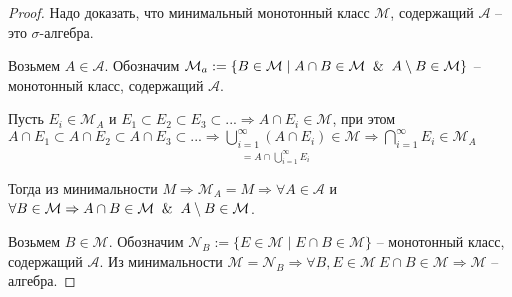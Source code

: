 \begin{proof}
    Надо доказать, что минимальный монотонный класс $\mathcal{M}$, содержащий $\mathcal{A}$ – это $\sigma$-алгебра.

    Возьмем $A\in \mathcal{A}$. Обозначим $\mathcal{M}_a :=\{B\in \mathcal{M} \mid A\cap B \in \mathcal{M}\And A\setminus B \in \mathcal{M}\}$ –
    монотонный класс, содержащий $\mathcal{A}$.

    Пусть $E_i\in \mathcal{M}_A$ и $E_1\subset E_2\subset E_3\subset ...\Rightarrow A\cap E_i \in \mathcal{M}$, при этом
    $A \cap E_1\subset A \cap E_2\subset A \cap E_3\subset ...\Rightarrow \underset{= A \cap \bigcup\limits_{i=1}^\infty E_i}{\bigcup\limits_{i=1}^\infty 
    (A\cap E_i)}\in \mathcal{M}\Rightarrow \bigcap\limits_{i=1}^\infty E_i \in \mathcal{M}_A$

    Тогда из минимальности $M\Rightarrow \mathcal{M}_A = M\Rightarrow \forall A\in \mathcal{A}$ и 
    $\forall B\in \mathcal{M}\Rightarrow A\cap B \in \mathcal{M}\And A \setminus B \in \mathcal{M}$.

    Возьмем $B\in \mathcal{M}$. Обозначим $\mathcal{N}_B:= \{E\in \mathcal{M} \mid E\cap B \in \mathcal{M}\}$
    – монотонный класс, содержащий $\mathcal{A}$. Из минимальности $\mathcal{M}=\mathcal{N}_B\Rightarrow
    \forall B, E\in \mathcal{M}\ E\cap B \in \mathcal{M}\Rightarrow \mathcal{M}$ – алгебра.
\end{proof}
